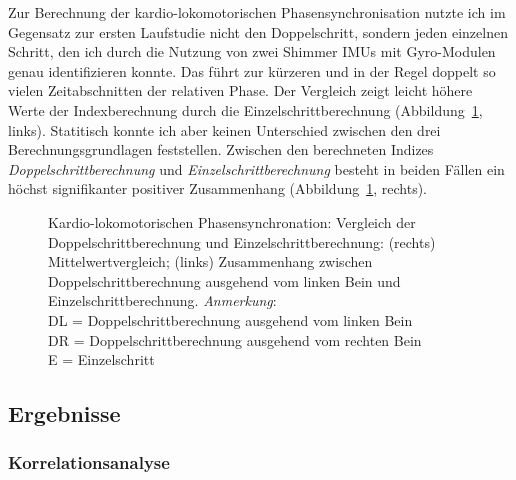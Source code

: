 Zur Berechnung der kardio-lokomotorischen Phasensynchronisation nutzte ich im Gegensatz zur ersten Laufstudie nicht den Doppelschritt, sondern jeden einzelnen Schritt, den ich durch die Nutzung von zwei Shimmer \acp{IMU} mit Gyro-Modulen genau identifizieren konnte. Das führt zur kürzeren und in der Regel doppelt so vielen Zeitabschnitten der relativen Phase. Der Vergleich zeigt leicht höhere Werte der Indexberechnung durch die Einzelschrittberechnung (Abbildung~\ref{fig:index_vergleich}, links). Statitisch konnte ich aber keinen Unterschied zwischen den drei Berechnungsgrundlagen feststellen. Zwischen den berechneten Indizes \emph{Doppelschrittberechnung} und \emph{Einzelschrittberechnung} besteht in beiden Fällen ein höchst signifikanter positiver Zusammenhang (Abbildung~\ref{fig:index_vergleich}, rechts). 
\begin{figure}
	[!htb]  \caption[Kardio-lokomotorischen Phasensynchronation: Vergleich der Doppelschrittberechnung und Einzelschrittberechnung.]{Kardio-lokomotorischen Phasensynchronation: Vergleich der Doppelschrittberechnung und Einzelschrittberechnung: (rechts) Mittelwertvergleich; (links) Zusammenhang zwischen Doppelschrittberechnung ausgehend vom linken Bein und Einzelschrittberechnung. \emph{Anmerkung}: \\
	\hspace{
	\textwidth}DL = Doppelschrittberechnung ausgehend vom linken Bein \\
	\hspace{
	\textwidth}DR = Doppelschrittberechnung ausgehend vom rechten Bein \\
	\hspace{
	\textwidth}E = Einzelschritt} \label{fig:index_vergleich} 
\end{figure}

\subsection{Ergebnisse} 

\label{sub:ergebnisse_5_3}

\subsubsection{Korrelationsanalyse} 

\label{ssub:korrelationsanalyse_5_3}

